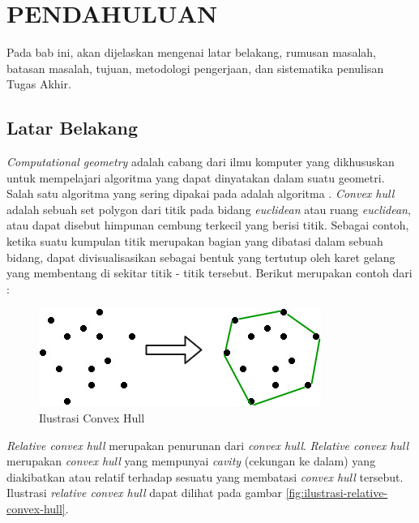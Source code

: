 \vspace{0ex}
\chapter {PENDAHULUAN}

Pada bab ini, akan dijelaskan mengenai latar belakang, rumusan masalah, batasan masalah, tujuan, metodologi pengerjaan, dan sistematika penulisan Tugas Akhir.

\section{ Latar Belakang}

\par \textit{Computational geometry} adalah cabang dari ilmu komputer yang dikhususkan untuk mempelajari algoritma yang dapat dinyatakan dalam suatu geometri. Salah satu algoritma yang sering dipakai pada \CG adalah algoritma \CH. \textit{Convex hull} adalah sebuah set polygon dari titik pada bidang \textit{euclidean} atau ruang \textit{euclidean}, atau dapat disebut himpunan cembung terkecil yang berisi titik. Sebagai contoh, ketika suatu kumpulan titik merupakan bagian yang dibatasi dalam sebuah bidang, \CH dapat divisualisasikan sebagai bentuk yang tertutup oleh karet gelang yang membentang di sekitar titik - titik tersebut. Berikut merupakan contoh dari \CH :
\begin{figure}[!h]
	\Centering
	\includegraphics [width=\textwidth]{bab1/img/ilustrasi-convex-hull}
	\caption {Ilustrasi Convex Hull}
	\label {fig:ilustrasi-convex-hull}
\end{figure}
\par \textit{Relative convex hull} merupakan penurunan dari \textit{convex hull}. \textit{Relative convex hull} merupakan \textit{convex hull} yang mempunyai \textit{cavity} (cekungan ke dalam) yang diakibatkan atau relatif terhadap sesuatu yang membatasi \textit{convex hull} tersebut. Ilustrasi \textit{relative convex hull} dapat dilihat pada gambar \ref{fig:ilustrasi-relative-convex-hull}.

